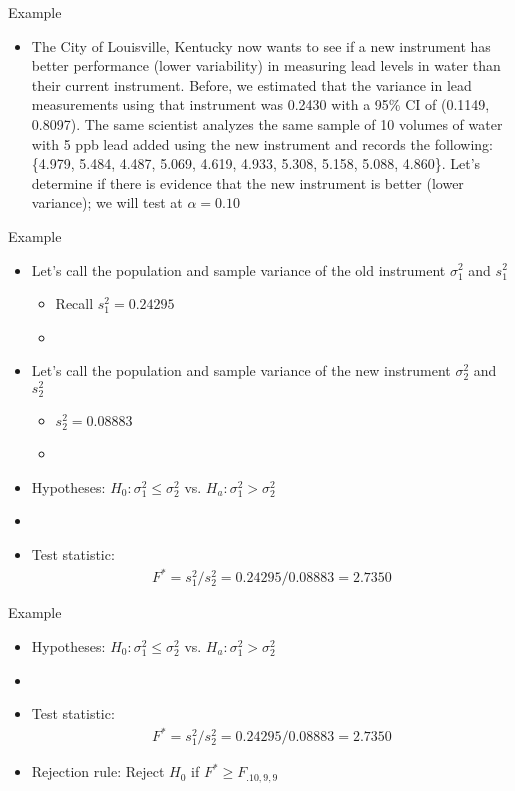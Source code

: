 \documentclass[xcolor=dvipsnames]{beamer}
\begin{document}
\begin{frame}{Example}
	\begin{itemize}
		\item The City of Louisville, Kentucky now wants to see if a new instrument has better performance (lower variability) in measuring lead levels in water than their current instrument. Before, we estimated that the variance in lead measurements using that instrument was 0.2430 with a 95\% CI of (0.1149, 0.8097). The same scientist analyzes the same sample of 10 volumes of water with 5 ppb lead added using the new instrument and records the following: \{4.979, 5.484, 4.487, 5.069, 4.619, 4.933, 5.308, 5.158, 5.088, 4.860\}. Let's determine if there is evidence that the new instrument is better (lower variance); we will test at $\alpha = 0.10$
	\end{itemize}
\end{frame}

\begin{frame}{Example}
	\begin{itemize}
		\item Let's call the population and sample variance of the old instrument $\sigma_1^2$ and $s_1^2$
		\begin{itemize}
			\item Recall $s_1^2 = 0.24295$
			\item[]
		\end{itemize}
		\item Let's call the population and sample variance of the new instrument $\sigma_2^2$ and $s_2^2$
		\begin{itemize}
			\item $s_2^2 = 0.08883$
			\item[]
		\end{itemize}

		\item Hypotheses: $H_0: \sigma_1^2 \leq \sigma_2^2$ vs. $H_a: \sigma_1^2 > \sigma_2^2$
		\item[]
		\item Test statistic:
		\begin{gather*}
		F^* = s_1^2 /s_2^2 = 0.24295 /  0.08883 = 2.7350
		\end{gather*}
	\end{itemize}
\end{frame}

\begin{frame}{Example}
	\begin{itemize}		
		\item Hypotheses: $H_0: \sigma_1^2 \leq \sigma_2^2$ vs. $H_a: \sigma_1^2 > \sigma_2^2$
		\item[]
		\item Test statistic:
		\begin{gather*}
		F^* = s_1^2 /s_2^2 = 0.24295 /  0.08883 = 2.7350
		\end{gather*}
		\item Rejection rule: Reject $H_0$ if $F^* \geq F_{.10, 9, 9}$
	\end{itemize}
\end{frame}
\end{document}
